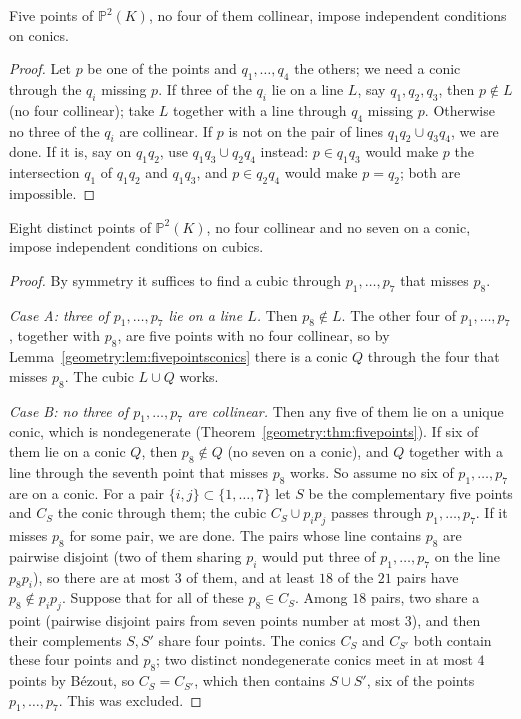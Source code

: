 \begin{lemma}\label{geometry:lem:fivepointsconics}
Five points of $\mathbb P^2(K)$, no four of them collinear, impose independent conditions on conics.
\end{lemma}

\begin{proof}
Let $p$ be one of the points and $q_1,\dots,q_4$ the others; we need a conic through the $q_i$ missing $p$. If three of the $q_i$ lie on a line $L$, say
$q_1,q_2,q_3$, then $p\notin L$ (no four collinear); take $L$ together with a line through $q_4$ missing $p$. Otherwise no three of the $q_i$ are collinear.
If $p$ is not on the pair of lines $q_1q_2\cup q_3q_4$, we are done. If it is, say on $q_1q_2$, use $q_1q_3\cup q_2q_4$ instead: $p\in q_1q_3$ would make $p$ the
intersection $q_1$ of $q_1q_2$ and $q_1q_3$, and $p\in q_2q_4$ would make $p=q_2$; both are impossible.
\end{proof}

\begin{lemma}\label{geometry:lem:eightpoints}
Eight distinct points of $\mathbb P^2(K)$, no four collinear and no seven on a conic, impose independent conditions on cubics.
\end{lemma}

\begin{proof}
By symmetry it suffices to find a cubic through $p_1,\dots,p_7$ that misses $p_8$.

\emph{Case A: three of $p_1,\dots,p_7$ lie on a line $L$.} Then $p_8\notin L$. The other four of $p_1,\dots,p_7$, together with $p_8$, are five points with no four
collinear, so by Lemma~\ref{geometry:lem:fivepointsconics} there is a conic $Q$ through the four that misses $p_8$. The cubic $L\cup Q$ works.

\emph{Case B: no three of $p_1,\dots,p_7$ are collinear.} Then any five of them lie on a unique conic, which is nondegenerate (Theorem~\ref{geometry:thm:fivepoints}).
If six of them lie on a conic $Q$, then $p_8\notin Q$ (no seven on a conic), and $Q$ together with a line through the seventh point that misses $p_8$ works. So
assume no six of $p_1,\dots,p_7$ are on a conic. For a pair $\{i,j\}\subset\{1,\dots,7\}$ let $S$ be the complementary five points and $C_S$ the conic through
them; the cubic $C_S\cup p_ip_j$ passes through $p_1,\dots,p_7$. If it misses $p_8$ for some pair, we are done. The pairs whose line contains $p_8$ are
pairwise disjoint (two of them sharing $p_i$ would put three of $p_1,\dots,p_7$ on the line $p_8p_i$), so there are at most $3$ of them, and at least $18$ of
the $21$ pairs have $p_8\notin p_ip_j$. Suppose that for all of these $p_8\in C_S$. Among $18$ pairs, two share a point (pairwise disjoint pairs from
seven points number at most $3$), and then their complements $S,S'$ share four points. The conics $C_S$ and $C_{S'}$ both contain these four points and $p_8$;
two distinct nondegenerate conics meet in at most $4$ points by B\'ezout, so $C_S=C_{S'}$, which then contains $S\cup S'$, six of the points
$p_1,\dots,p_7$. This was excluded.
\end{proof}

